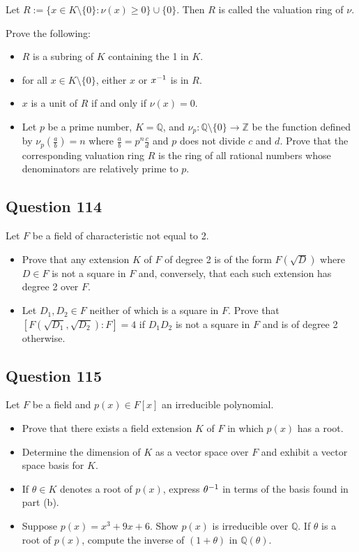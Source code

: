 \documentclass[12pt]{article}
\begin{document}
Let \(R:=\{x\in K\setminus\{0\}:\nu(x)\geq0\}\cup\{0\}\). Then \(R\) is
called the valuation ring of \(\nu\).

Prove the following:

\begin{itemize}
\item
  \(R\) is a subring of \(K\) containing the 1 in \(K\).
\item
  for all \(x\in K\setminus\{0\}\), either \(x\) or \(x^{-1}\) is in
  \(R\).
\item
  \(x\) is a unit of \(R\) if and only if \(\nu(x)=0\).
\item
  Let \(p\) be a prime number, \(K=\mathbb Q\), and
  \(\nu_p:\mathbb Q\setminus\{0\}\rightarrow\mathbb Z\) be the function
  defined by \(\nu_p(\frac ab)=n\) where \(\frac ab=p^n\frac cd\) and
  \(p\) does not divide \(c\) and \(d\). Prove that the corresponding
  valuation ring \(R\) is the ring of all rational numbers whose
  denominators are relatively prime to \(p\).
\end{itemize}

\hypertarget{question-114}{%
\subsection{Question 114}\label{question-114}}

Let \(F\) be a field of characteristic not equal to 2.

\begin{itemize}
\item
  Prove that any extension \(K\) of \(F\) of degree 2 is of the form
  \(F(\sqrt D)\) where \(D\in F\) is not a square in \(F\) and,
  conversely, that each such extension has degree 2 over \(F\).
\item
  Let \(D_1,D_2\in F\) neither of which is a square in \(F\). Prove that
  \([F(\sqrt{D_1},\sqrt{D_2}):F]=4\) if \(D_1D_2\) is not a square in
  \(F\) and is of degree 2 otherwise.
\end{itemize}

\hypertarget{question-115}{%
\subsection{Question 115}\label{question-115}}

Let \(F\) be a field and \(p(x)\in F[x]\) an irreducible polynomial.

\begin{itemize}
\item
  Prove that there exists a field extension \(K\) of \(F\) in which
  \(p(x)\) has a root.
\item
  Determine the dimension of \(K\) as a vector space over \(F\) and
  exhibit a vector space basis for \(K\).
\item
  If \(\theta\in K\) denotes a root of \(p(x)\), express \(\theta^{-1}\)
  in terms of the basis found in part (b).
\item
  Suppose \(p(x)=x^3+9x+6\). Show \(p(x)\) is irreducible over
  \(\mathbb Q\). If \(\theta\) is a root of \(p(x)\), compute the
  inverse of \((1+\theta)\) in \(\mathbb Q(\theta)\).
\end{itemize}
\end{document}
